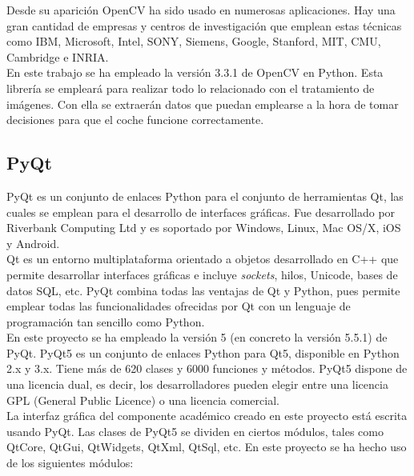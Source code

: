 Desde su aparición OpenCV ha sido usado en numerosas aplicaciones. Hay una gran cantidad de empresas y centros de investigación que emplean estas técnicas como IBM, Microsoft, Intel, SONY, Siemens, Google, Stanford, MIT, CMU, Cambridge e INRIA.\\

En este trabajo se ha empleado la versión 3.3.1 de OpenCV en Python. Esta librería se empleará para realizar todo lo relacionado con el tratamiento de imágenes. Con ella se extraerán datos que puedan emplearse a la hora de tomar decisiones para que el coche funcione correctamente.


\subsection{PyQt}

PyQt \cite{pyqt} \cite{pyqt1} es un conjunto de enlaces Python para el conjunto de herramientas Qt, las cuales se emplean para el desarrollo de interfaces gráficas. Fue desarrollado por Riverbank Computing Ltd y es soportado por Windows, Linux, Mac OS/X, iOS y Android.\\

Qt es un entorno multiplataforma orientado a objetos desarrollado en C++ que permite desarrollar interfaces gráficas e incluye \textit{sockets}, hilos, Unicode, bases de datos SQL, etc. PyQt combina todas las ventajas de Qt y Python, pues permite emplear todas las funcionalidades ofrecidas por Qt con un lenguaje de programación tan sencillo como Python.\\

En este proyecto se ha empleado la versión 5 (en concreto la versión 5.5.1) de PyQt. PyQt5 es un conjunto de enlaces Python para Qt5, disponible en Python 2.x y 3.x. Tiene más de 620 clases y 6000 funciones y métodos. PyQt5 dispone de una licencia dual, es decir, los desarrolladores pueden elegir entre una licencia GPL (General Public Licence) o una licencia comercial. \\

La interfaz gráfica del componente académico creado en este proyecto está escrita usando PyQt. Las clases de PyQt5 se dividen en ciertos módulos, tales como QtCore, QtGui, QtWidgets, QtXml, QtSql, etc. En este proyecto se ha hecho uso de los siguientes módulos:


